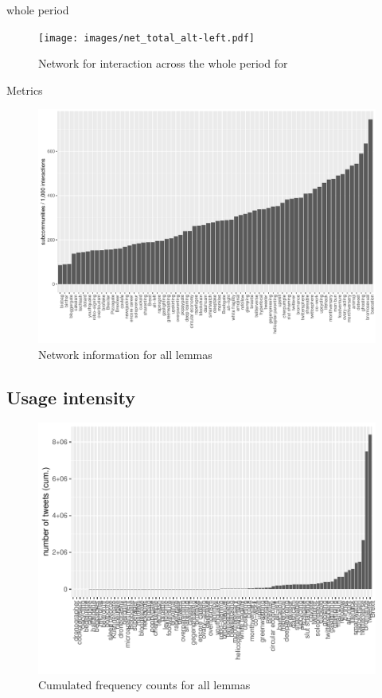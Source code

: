 \documentclass[
  a4paper,
  ]{scrartcl}
\begin{document}
      whole period

        \begin{figure}[H]
          \centering
          \texttt{[image: images/net\_total\_alt-left.pdf]}
          \caption{Network for interaction across the whole period for }
        \end{figure}

    Metrics

    \begin{figure}[H]
      \centering
      \includegraphics[width=\linewidth, height=.8\textheight, keepaspectratio]{images/communities_last_all.pdf}
      \caption{Network information for all lemmas}
    \end{figure}

  \subsection{Usage intensity}

    \begin{figure}[H]
      \centering
      \includegraphics[width=\linewidth, height=.8\textheight, keepaspectratio]{images/comp_ui_all_cum.pdf}
      \caption{Cumulated frequency counts for all lemmas}
    \end{figure}
\end{document}
